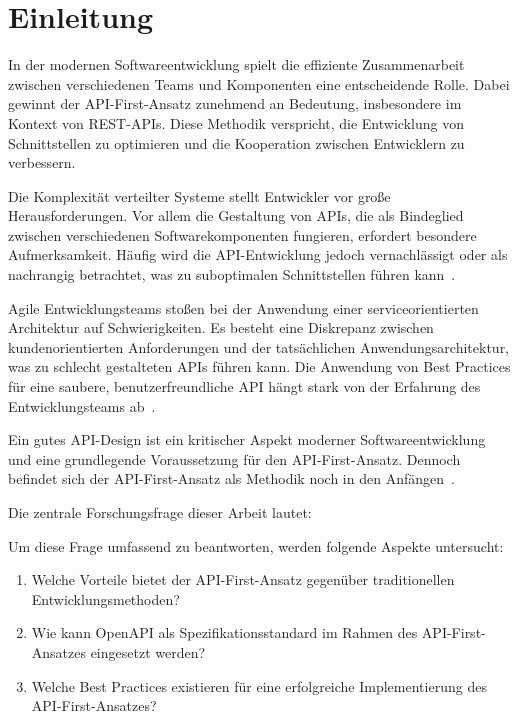 \chapter{Einleitung}
In der modernen Softwareentwicklung spielt die effiziente Zusammenarbeit zwischen verschiedenen Teams und Komponenten eine entscheidende Rolle. Dabei gewinnt der \acs{API}-First-Ansatz zunehmend an Bedeutung, insbesondere im Kontext von \ac{REST}-\acp{API}. Diese Methodik verspricht, die Entwicklung von Schnittstellen zu optimieren und die Kooperation zwischen Entwicklern zu verbessern.

Die Komplexität verteilter Systeme stellt Entwickler vor große Herausforderungen. Vor allem die Gestaltung von \acp{API}, die als Bindeglied zwischen verschiedenen Softwarekomponenten fungieren, erfordert besondere Aufmerksamkeit. Häufig wird die \ac{API}-Entwicklung jedoch vernachlässigt oder als nachrangig betrachtet, was zu suboptimalen Schnittstellen führen kann~\autocite[73]{bea22}.

Agile Entwicklungsteams stoßen bei der Anwendung einer serviceorientierten Architektur auf Schwierigkeiten. Es besteht eine Diskrepanz zwischen kundenorientierten Anforderungen und der tatsächlichen Anwendungsarchitektur, was zu schlecht gestalteten \acp{API} führen kann. Die Anwendung von Best Practices für eine saubere, benutzerfreundliche \ac{API} hängt stark von der Erfahrung des Entwicklungsteams ab~\autocite[10]{riv13}.

Ein gutes \ac{API}-Design ist ein kritischer Aspekt moderner Softwareentwicklung und eine grundlegende Voraussetzung für den \ac{API}-First-Ansatz. Dennoch befindet sich der \ac{API}-First-Ansatz als Methodik noch in den Anfängen~\autocite[75,78]{bea22}.

Die zentrale Forschungsfrage dieser Arbeit lautet:

Um diese Frage umfassend zu beantworten, werden folgende Aspekte untersucht:
\begin{enumerate}
	\item Welche Vorteile bietet der \acs{API}-First-Ansatz gegenüber traditionellen Entwicklungsmethoden?
	\item Wie kann OpenAPI als Spezifikationsstandard im Rahmen des \acs{API}-First-Ansatzes eingesetzt werden?
	\item Welche Best Practices existieren für eine erfolgreiche Implementierung des \acs{API}-First-Ansatzes?
\end{enumerate}

